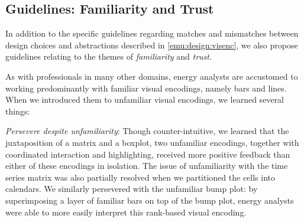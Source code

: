 
\subsection{Guidelines: Familiarity and Trust}
\label{emu:discussion-guidelines}


In addition to the specific guidelines regarding matches and mismatches between design choices and abstractions described in \autoref{emu:design:visenc}, we also propose guidelines relating to the themes of {\it familiarity} and {\it trust}.

 As with professionals in many other domains, energy analysts are accustomed to working predominantly with familiar visual encodings, namely bars and lines.
When we introduced them to unfamiliar visual encodings, we learned several things:

{\it Persevere despite unfamiliarity}: Though counter-intuitive, we learned that the juxtaposition of a matrix and a boxplot, two unfamiliar encodings, together with coordinated interaction and highlighting, received more positive feedback than either of these encodings in isolation.
The issue of unfamiliarity with the time series matrix was also partially resolved when we partitioned the cells into calendars.
We similarly persevered with the unfamiliar bump plot: by superimposing a layer of familiar bars on top of the bump plot, energy analysts were able to more easily interpret this rank-based visual encoding.

